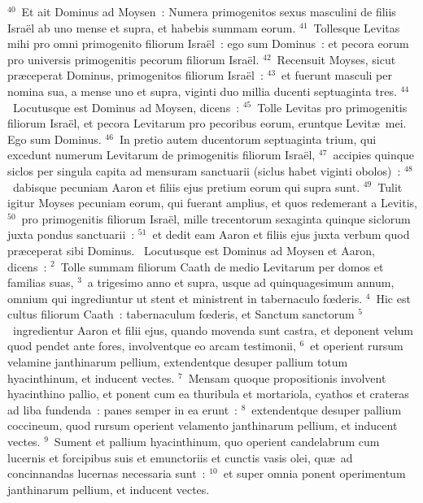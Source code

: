 ${}^{40}$~Et ait Dominus ad Moysen~: Numera primogenitos sexus masculini de filiis Isra\"el ab uno mense et supra, et habebis summam eorum.
${}^{41}$~Tollesque Levitas mihi pro omni primogenito filiorum Isra\"el~: ego sum Dominus~: et pecora eorum pro universis primogenitis pecorum filiorum Isra\"el.
${}^{42}$~Recensuit Moyses, sicut pr\ae ceperat Dominus, primogenitos filiorum Isra\"el~:
${}^{43}$~et fuerunt masculi per nomina sua, a mense uno et supra, viginti duo millia ducenti septuaginta tres.
${}^{44}$~Locutusque est Dominus ad Moysen, dicens~:
${}^{45}$~Tolle Levitas pro primogenitis filiorum Isra\"el, et pecora Levitarum pro pecoribus eorum, eruntque Levit\ae\ mei. Ego sum Dominus.
${}^{46}$~In pretio autem ducentorum septuaginta trium, qui excedunt numerum Levitarum de primogenitis filiorum Isra\"el,
${}^{47}$~accipies quinque siclos per singula capita ad mensuram sanctuarii (siclus habet viginti obolos)~:
${}^{48}$~dabisque pecuniam Aaron et filiis ejus pretium eorum qui supra sunt.
${}^{49}$~Tulit igitur Moyses pecuniam eorum, qui fuerant amplius, et quos redemerant a Levitis,
${}^{50}$~pro primogenitis filiorum Isra\"el, mille trecentorum sexaginta quinque siclorum juxta pondus sanctuarii~:
${}^{51}$~et dedit eam Aaron et filiis ejus juxta verbum quod pr\ae ceperat sibi Dominus.
~\lettrine[lines=10,image=true,loversize=0.05,lraise=-0.03]{L}{}ocutusque est Dominus ad Moysen et Aaron, dicens~:
${}^{2}$~Tolle summam filiorum Caath de medio Levitarum per domos et familias suas,
${}^{3}$~a trigesimo anno et supra, usque ad quinquagesimum annum, omnium qui ingrediuntur ut stent et ministrent in tabernaculo fœderis.
${}^{4}$~Hic est cultus filiorum Caath~: tabernaculum fœderis, et Sanctum sanctorum
${}^{5}$~ingredientur Aaron et filii ejus, quando movenda sunt castra, et deponent velum quod pendet ante fores, involventque eo arcam testimonii,
${}^{6}$~et operient rursum velamine janthinarum pellium, extendentque desuper pallium totum hyacinthinum, et inducent vectes.
${}^{7}$~Mensam quoque propositionis involvent hyacinthino pallio, et ponent cum ea thuribula et mortariola, cyathos et crateras ad liba fundenda~: panes semper in ea erunt~:
${}^{8}$~extendentque desuper pallium coccineum, quod rursum operient velamento janthinarum pellium, et inducent vectes.
${}^{9}$~Sument et pallium hyacinthinum, quo operient candelabrum cum lucernis et forcipibus suis et emunctoriis et cunctis vasis olei, qu\ae\ ad concinnandas lucernas necessaria sunt~:
${}^{10}$~et super omnia ponent operimentum janthinarum pellium, et inducent vectes.
